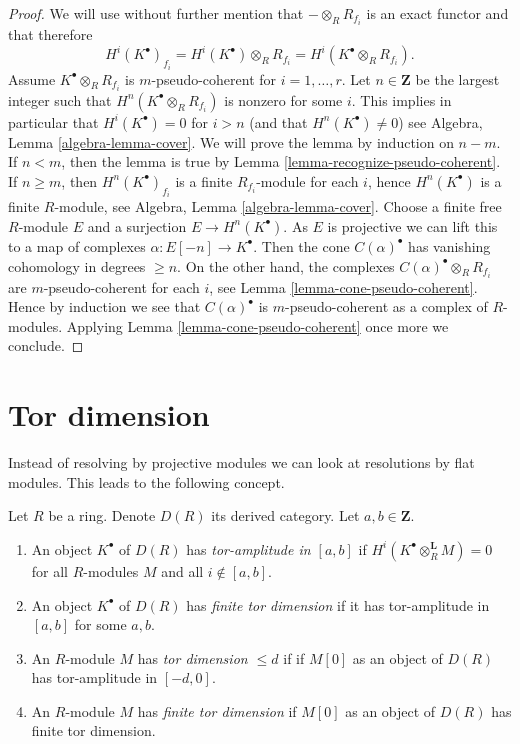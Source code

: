 \begin{proof}
We will use without further mention that $- \otimes_R R_{f_i}$ is
an exact functor and that therefore
$$
H^i(K^\bullet)_{f_i} =
H^i(K^\bullet) \otimes_R R_{f_i} = H^i(K^\bullet \otimes_R R_{f_i}).
$$
Assume $K^\bullet \otimes_R R_{f_i}$ is $m$-pseudo-coherent
for $i = 1, \ldots, r$. Let $n \in \mathbf{Z}$ be the largest
integer such that $H^n(K^\bullet \otimes_R R_{f_i})$ is nonzero
for some $i$. This implies in particular that $H^i(K^\bullet) = 0$
for $i > n$ (and that $H^n(K^\bullet) \not = 0$) see
Algebra, Lemma \ref{algebra-lemma-cover}.
We will prove the lemma by induction on $n - m$.
If $n < m$, then the lemma is true by
Lemma \ref{lemma-recognize-pseudo-coherent}.
If $n \geq m$, then $H^n(K^\bullet)_{f_i}$ is a finite $R_{f_i}$-module
for each $i$, hence $H^n(K^\bullet)$ is a finite $R$-module, see
Algebra, Lemma \ref{algebra-lemma-cover}.
Choose a finite free $R$-module $E$ and a surjection $E \to H^n(K^\bullet)$.
As $E$ is projective we can lift this to a map of complexes
$\alpha : E[-n] \to K^\bullet$. Then the cone $C(\alpha)^\bullet$ has
vanishing cohomology in degrees $\geq n$. On the other hand, the
complexes $C(\alpha)^\bullet \otimes_R R_{f_i}$ are $m$-pseudo-coherent
for each $i$, see
Lemma \ref{lemma-cone-pseudo-coherent}.
Hence by induction we see that $C(\alpha)^\bullet$ is $m$-pseudo-coherent
as a complex of $R$-modules. Applying
Lemma \ref{lemma-cone-pseudo-coherent}
once more we conclude.
\end{proof}








\section{Tor dimension}
\label{section-tor}

\noindent
Instead of resolving by projective modules we can look
at resolutions by flat modules. This leads to the following
concept.

\begin{definition}
\label{definition-tor-amplitude}
Let $R$ be a ring. Denote $D(R)$ its derived category.
Let $a, b \in \mathbf{Z}$.
\begin{enumerate}
\item An object $K^\bullet$ of $D(R)$ has
{\it tor-amplitude in $[a, b]$}
if $H^i(K^\bullet \otimes_R^\mathbf{L} M) = 0$ for all $R$-modules
$M$ and all $i \not \in [a, b]$.
\item An object $K^\bullet$ of $D(R)$ has {\it finite tor dimension}
if it has tor-amplitude in $[a, b]$ for some $a, b$.
\item An $R$-module $M$ has {\it tor dimension $\leq d$} if
if $M[0]$ as an object of $D(R)$ has tor-amplitude in $[-d, 0]$.
\item An $R$-module $M$ has {\it finite tor dimension}
if $M[0]$ as an object of $D(R)$ has finite tor dimension.
\end{enumerate}
\end{definition}

